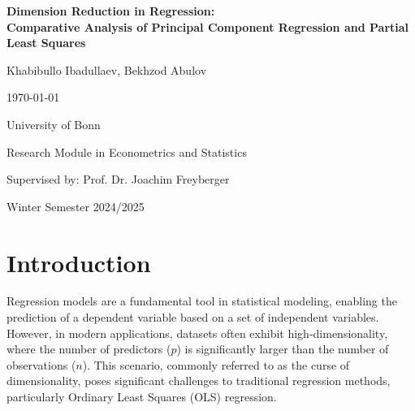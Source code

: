 \documentclass[11pt,twoside,a4paper]{article}
\begin{document}
\begin{titlepage}
    \centering
    {\LARGE\bfseries Dimension Reduction in Regression: \\ Comparative Analysis of Principal Component Regression and Partial Least Squares\par}
    \vspace{1.5cm}
    
    {\Large Khabibullo Ibadullaev, Bekhzod Abulov\par}
    \vspace{0.5cm}
    
    {\large \today\par}
    \vspace{3cm}
    
    {\large University of Bonn\par}
    {\large Research Module in Econometrics and Statistics\par}
    {\large Supervised by: Prof. Dr. Joachim Freyberger\par}
    
    \vspace{0.5cm}
    
    {\large Winter Semester 2024/2025\par}
\end{titlepage}

\newpage

\thispagestyle{empty}
\tableofcontents

\newpage

\setlength{\abovedisplayskip}{0.35cm}
\setlength{\belowdisplayskip}{0.35cm}

\setlength{\abovedisplayshortskip}{0.2cm}
\setlength{\belowdisplayshortskip}{0.35cm}
\setlength{\parskip}{0.5em}

\section{Introduction}

Regression models are a fundamental tool in statistical modeling, enabling the prediction of a dependent variable based on a set of independent variables. However, in modern applications, datasets often exhibit high-dimensionality, where the number of predictors (\( p \)) is significantly larger than the number of observations (\( n \)). This scenario, commonly referred to as the curse of dimensionality, poses significant challenges to traditional regression methods, particularly Ordinary Least Squares (OLS) regression.
\end{document}
